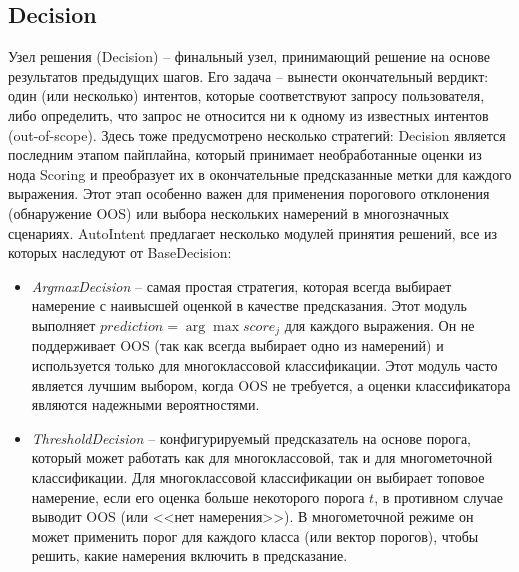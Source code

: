 \documentclass[14pt,a4paper,oneside,openany]{extbook}
\begin{document}
\subsection{Decision}
\label{sec:org6710764}
Узел решения (Decision) – финальный узел, принимающий решение на основе результатов предыдущих шагов. Его задача – вынести окончательный вердикт: один (или несколько) интентов, которые соответствуют запросу пользователя, либо определить, что запрос не относится ни к одному из известных интентов (out-of-scope). Здесь тоже предусмотрено несколько стратегий: Decision является последним этапом пайплайна, который принимает необработанные оценки из нода Scoring и преобразует их в окончательные предсказанные метки для каждого выражения. Этот этап особенно важен для применения порогового отклонения (обнаружение OOS) или выбора нескольких намерений в многозначных сценариях. AutoIntent предлагает несколько модулей принятия решений, все из которых наследуют от BaseDecision:

\begin{itemize}
\item \emph{ArgmaxDecision} -- самая простая стратегия, которая всегда выбирает намерение с наивысшей оценкой в качестве предсказания. Этот модуль выполняет \(prediction = \arg\max score_j\) для каждого выражения. Он не поддерживает OOS (так как всегда выбирает одно из намерений) и используется только для многоклассовой классификации. Этот модуль часто является лучшим выбором, когда OOS не требуется, а оценки классификатора являются надежными вероятностями.

\item \emph{ThresholdDecision} -- конфигурируемый предсказатель на основе порога, который может работать как для многоклассовой, так и для многометочной классификации. Для многоклассовой классификации он выбирает топовое намерение, если его оценка больше некоторого порога \(t\), в противном случае выводит OOS (или {}<<нет намерения>>{}). В многометочной режиме он может применить порог для каждого класса (или вектор порогов), чтобы решить, какие намерения включить в предсказание.
\end{itemize}
\end{document}
